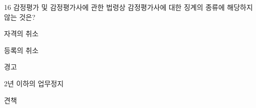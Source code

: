 \begin{question}{16}
감정평가 및 감정평가사에 관한 법령상 감정평가사에 대한 징계의 종류에 해당하지 않는 것은?
\begin{choices}
  \item 자격의 취소
  \item 등록의 취소
  \item 경고
  \item 2년 이하의 업무정지
  \item 견책
\end{choices}
\end{question}

